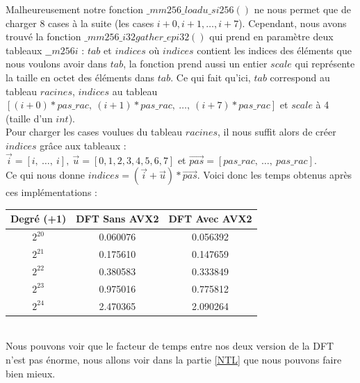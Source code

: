 \documentclass[12pt, a4paper]{article}
\begin{document}
Malheureusement notre fonction $\_mm256\_loadu\_si256()$ ne nous permet que de charger 8 cases à la suite (les cases $i+0, i+1,\dots,i+7$).
Cependant, nous avons trouvé la fonction $\_mm256\_i32gather\_epi32()$ qui prend en paramètre deux tableaux $\_\_m256i$ : $tab$ et $indices$ où $indices$ contient les indices des éléments que nous voulons avoir dans $tab$, la fonction prend aussi un entier $scale$ qui représente la taille en octet des éléments dans $tab$. Ce qui fait qu'ici, $tab$ correspond au tableau $racines$, $indices$ au tableau $[(i+0)*pas\_rac,\ (i+1)*pas\_rac,\ \dots,\ (i+7)*pas\_rac]$ et $scale$ à 4 (taille d'un $int$).\\
\indent Pour charger les cases voulues du tableau $racines$, il nous suffit alors de créer $indices$ grâce aux tableaux : \\ $\overrightarrow{i} = [i,\ \dots,\ i],\  \overrightarrow{u} = [0, 1, 2, 3, 4, 5, 6, 7]$ et $ \overrightarrow{pas} = [pas\_rac,\ \dots,\ pas\_rac]$. \\
Ce qui nous donne $indices = (\overrightarrow{i}+\overrightarrow{u})*\overrightarrow{pas}$.
\newpage	
Voici donc les temps obtenus après ces implémentations :

\begin{center}
\begin{tabular}{||c c c||}
\hline
Degré (+1) & DFT Sans AVX2 & DFT Avec AVX2 \\
\hline\hline
$2^{20}$ & 0.060076 & 0.056392 \\
\hline
$2^{21}$ & 0.175610 & 0.147659 \\
\hline
$2^{22}$ & 0.380583 & 0.333849 \\
\hline
$2^{23}$ & 0.975016 & 0.775812 \\
\hline
$2^{24}$ & 2.470365 & 2.090264 \\
\hline
\end{tabular}
\end{center}
{}
\ \\
\indent Nous pouvons voir que le facteur de temps entre nos deux version de la DFT n'est pas énorme, nous allons voir dans la partie \ref{NTL} que nous pouvons faire bien mieux.
\end{document}
